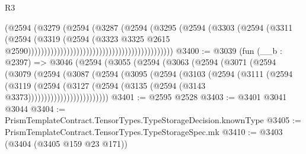 \begin{lexlean}{R3}
\begin{coremodule}
                                                                  (@2594
                                                                    (@3279
                                                                      (@2594
                                                                        (@3287
                                                                          (@2594
                                                                            (@3295
                                                                              (@2594
                                                                                (@3303
                                                                                  (@2594
                                                                                    (@3311
                                                                                      (@2594
                                                                                        (@3319
                                                                                          (@2594
                                                                                            (@3323
                                                                                              @3325
                                                                                              @2615
                                                                                              @2590)))))))))))))))))))))))))))))))))))))))))))))
@3400 := @3039
    (fun (__b : @2397) =>
    @3046
      (@2594
        (@3055
          (@2594
            (@3063
              (@2594
                (@3071
                  (@2594
                    (@3079
                      (@2594
                        (@3087
                          (@2594
                            (@3095
                              (@2594
                                (@3103
                                  (@2594
                                    (@3111
                                      (@2594
                                        (@3119
                                          (@2594
                                            (@3127
                                              (@2594
                                                (@3135 (@2594 (@3143 @3373)))))))))))))))))))))))))
@3401 := @2595 @2528
@3403 := @3401 @3041 @3044
@3404 := PrismTemplateContract.TensorTypes.TypeStorageDecision.knownType
@3405 := PrismTemplateContract.TensorTypes.TypeStorageSpec.mk
@3410 := @3403 (@3404 (@3405 @159 @23 @171))

\end{coremodule}
\end{lexlean}
